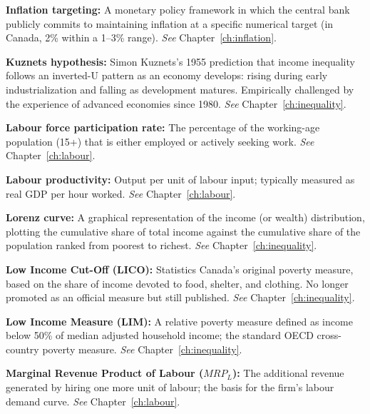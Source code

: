 \vspace{6pt}
\noindent\textbf{Inflation targeting:} A monetary policy framework in which the central bank publicly commits to maintaining inflation at a specific numerical target (in Canada, 2\% within a 1--3\% range). \textit{See} Chapter~\ref{ch:inflation}.

\vspace{6pt}
\noindent\textbf{Kuznets hypothesis:} Simon Kuznets's 1955 prediction that income inequality follows an inverted-U pattern as an economy develops: rising during early industrialization and falling as development matures. Empirically challenged by the experience of advanced economies since 1980. \textit{See} Chapter~\ref{ch:inequality}.

\vspace{6pt}
\noindent\textbf{Labour force participation rate:} The percentage of the working-age population (15+) that is either employed or actively seeking work. \textit{See} Chapter~\ref{ch:labour}.

\vspace{6pt}
\noindent\textbf{Labour productivity:} Output per unit of labour input; typically measured as real GDP per hour worked. \textit{See} Chapter~\ref{ch:labour}.

\vspace{6pt}
\noindent\textbf{Lorenz curve:} A graphical representation of the income (or wealth) distribution, plotting the cumulative share of total income against the cumulative share of the population ranked from poorest to richest. \textit{See} Chapter~\ref{ch:inequality}.

\vspace{6pt}
\noindent\textbf{Low Income Cut-Off (LICO):} Statistics Canada's original poverty measure, based on the share of income devoted to food, shelter, and clothing. No longer promoted as an official measure but still published. \textit{See} Chapter~\ref{ch:inequality}.

\vspace{6pt}
\noindent\textbf{Low Income Measure (LIM):} A relative poverty measure defined as income below 50\% of median adjusted household income; the standard OECD cross-country poverty measure. \textit{See} Chapter~\ref{ch:inequality}.

\vspace{6pt}
\noindent\textbf{Marginal Revenue Product of Labour ($MRP_L$):} The additional revenue generated by hiring one more unit of labour; the basis for the firm's labour demand curve. \textit{See} Chapter~\ref{ch:labour}.

